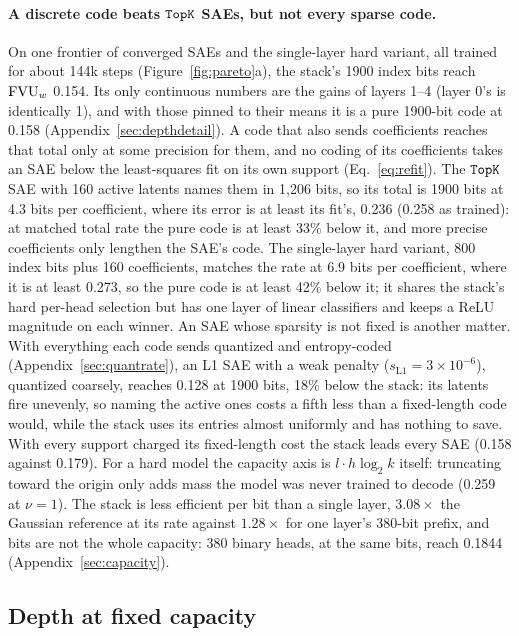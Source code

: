 \paragraph{A discrete code beats $\mathop{\mathtt{TopK}}\limits$ SAEs, but not every sparse
code.} On one
frontier of converged SAEs and the single-layer hard variant, all trained
for about 144k steps (Figure~\ref{fig:pareto}a), the stack's 1900 index
bits reach $\mathrm{FVU}_w$ 0.154. Its only continuous numbers are the gains of
layers 1--4 (layer 0's is identically 1), and with those pinned to their
means it is a pure 1900-bit code at 0.158
(Appendix~\ref{sec:depthdetail}). A code that also sends coefficients
reaches that total only at some precision for them, and no coding of its
coefficients takes an SAE below the least-squares fit on its own support
(Eq.~\eqref{eq:refit}). The $\mathop{\mathtt{TopK}}\limits$ SAE with 160 active latents names
them in 1{,}206 bits, so its total is 1900 bits at 4.3 bits per
coefficient, where its error is at least its fit's, 0.236 (0.258 as
trained): at matched total rate the pure code is at least 33\% below
it, and more precise coefficients only lengthen the SAE's code. The
single-layer hard variant, 800 index bits plus 160 coefficients, matches
the rate at 6.9 bits per coefficient, where it is at least 0.273, so the
pure code is at least 42\% below it; it shares the stack's hard per-head
selection but has one layer of linear classifiers and keeps a ReLU
magnitude on each winner. An SAE whose sparsity is not fixed is another
matter. With everything each code sends quantized and entropy-coded
(Appendix~\ref{sec:quantrate}), an L1 SAE with a weak penalty
($s_{\mathrm{L1}}{=}3\times10^{-6}$), quantized coarsely, reaches 0.128 at
1900 bits, 18\% below the stack: its latents fire unevenly, so naming the
active ones costs a fifth less than a fixed-length code would, while the
stack uses its entries almost uniformly and has nothing to save. With
every support charged its fixed-length cost the stack leads every SAE
(0.158 against 0.179). For a hard model the capacity axis is $l\cdot h\log_2 k$ itself:
truncating toward the origin only adds mass the
model was never trained to decode (0.259 at $\nu{=}1$). The stack is less
efficient per bit than a single layer, $3.08\times$ the Gaussian reference
at its rate against $1.28\times$ for one layer's 380-bit prefix, and bits
are not the whole capacity: 380 binary heads, at the same bits, reach
0.1844 (Appendix~\ref{sec:capacity}).

\subsection{Depth at fixed capacity}
\label{sec:depth}

